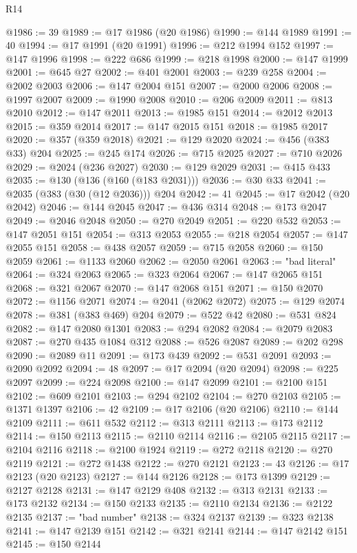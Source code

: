 \begin{lexlean}{R14}
\begin{coremodule}
@1986 := 39
@1989 := @17 @1986 (@20 @1986)
@1990 := @144 @1989
@1991 := 40
@1994 := @17 @1991 (@20 @1991)
@1996 := @212 @1994 @152
@1997 := @147 @1996
@1998 := @222 @686
@1999 := @218 @1998
@2000 := @147 @1999
@2001 := @645 @27
@2002 := @401 @2001
@2003 := @239 @258
@2004 := @2002 @2003
@2006 := @147 @2004 @151
@2007 := @2000 @2006
@2008 := @1997 @2007
@2009 := @1990 @2008
@2010 := @206 @2009
@2011 := @813 @2010
@2012 := @147 @2011
@2013 := @1985 @151
@2014 := @2012 @2013
@2015 := @359 @2014
@2017 := @147 @2015 @151
@2018 := @1985 @2017
@2020 := @357 (@359 @2018)
@2021 := @129 @2020
@2024 := @456 (@383 @33) @204
@2025 := @245 @174
@2026 := @715 @2025
@2027 := @710 @2026
@2029 := @2024 (@236 @2027)
@2030 := @129 @2029
@2031 := @415 @433
@2035 := @130 (@136 (@160 (@183 @2031)))
@2036 := @30 @33
@2041 := @2035 (@383 (@30 (@12 @2036))) @204
@2042 := 41
@2045 := @17 @2042 (@20 @2042)
@2046 := @144 @2045
@2047 := @436 @314
@2048 := @173 @2047
@2049 := @2046 @2048
@2050 := @270 @2049
@2051 := @220 @532
@2053 := @147 @2051 @151
@2054 := @313 @2053
@2055 := @218 @2054
@2057 := @147 @2055 @151
@2058 := @438 @2057
@2059 := @715 @2058
@2060 := @150 @2059
@2061 := @1133 @2060
@2062 := @2050 @2061
@2063 := "bad literal"
@2064 := @324 @2063
@2065 := @323 @2064
@2067 := @147 @2065 @151
@2068 := @321 @2067
@2070 := @147 @2068 @151
@2071 := @150 @2070
@2072 := @1156 @2071
@2074 := @2041 (@2062 @2072)
@2075 := @129 @2074
@2078 := @381 (@383 @469) @204
@2079 := @522 @42
@2080 := @531 @824
@2082 := @147 @2080 @1301
@2083 := @294 @2082
@2084 := @2079 @2083
@2087 := @270 @435 @1084 @312
@2088 := @526 @2087
@2089 := @202 @298
@2090 := @2089 @11
@2091 := @173 @439
@2092 := @531 @2091
@2093 := @2090 @2092
@2094 := 48
@2097 := @17 @2094 (@20 @2094)
@2098 := @225 @2097
@2099 := @224 @2098
@2100 := @147 @2099
@2101 := @2100 @151
@2102 := @609 @2101
@2103 := @294 @2102
@2104 := @270 @2103
@2105 := @1371 @1397
@2106 := 42
@2109 := @17 @2106 (@20 @2106)
@2110 := @144 @2109
@2111 := @611 @532
@2112 := @313 @2111
@2113 := @173 @2112
@2114 := @150 @2113
@2115 := @2110 @2114
@2116 := @2105 @2115
@2117 := @2104 @2116
@2118 := @2100 @1924
@2119 := @272 @2118
@2120 := @270 @2119
@2121 := @272 @1438
@2122 := @270 @2121
@2123 := 43
@2126 := @17 @2123 (@20 @2123)
@2127 := @144 @2126
@2128 := @173 @1399
@2129 := @2127 @2128
@2131 := @147 @2129 @408
@2132 := @313 @2131
@2133 := @173 @2132
@2134 := @150 @2133
@2135 := @2110 @2134
@2136 := @2122 @2135
@2137 := "bad number"
@2138 := @324 @2137
@2139 := @323 @2138
@2141 := @147 @2139 @151
@2142 := @321 @2141
@2144 := @147 @2142 @151
@2145 := @150 @2144

\end{coremodule}
\end{lexlean}
